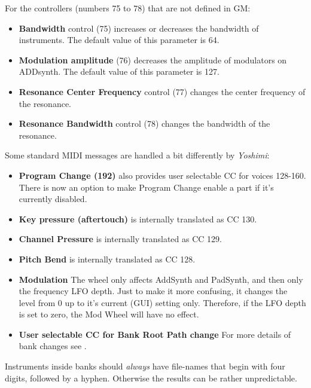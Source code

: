   For the controllers (numbers 75 to 78) that are not defined in GM:

   \begin{itemize}
      \item \textbf{Bandwidth} control (75) increases or decreases the bandwidth
      of instruments. The default value of this parameter is 64. 
      \item \textbf{Modulation amplitude} (76) decreases the amplitude of
      modulators on ADDsynth. The default value of this parameter is 127. 
      \item \textbf{Resonance Center Frequency} control (77) changes the center
      frequency of the resonance. 
      \item \textbf{Resonance Bandwidth} control (78) changes the bandwidth of the
      resonance. 
   \end{itemize}

   Some standard MIDI messages are handled a bit differently by
   \textsl{Yoshimi}:

   \begin{itemize}
      \item \textbf{Program Change (192)}
         also provides user selectable CC for
         voices 128-160.  There is now an option to make Program Change enable
         a part if it's currently disabled.
      \item \textbf{Key pressure (aftertouch)}
         is internally translated as CC 130.
      \item \textbf{Channel Pressure}
         is internally translated as CC 129.
      \item \textbf{Pitch Bend}
         is internally translated as CC 128.
      \item \textbf{Modulation}
         The wheel only affects AddSynth and PadSynth, and then only the
         frequency LFO depth. Just to make it more confusing, it changes the
         level from 0 up to it's current (GUI) setting only. Therefore, if the
         LFO depth is set to zero, the Mod Wheel will have no effect.
      \item \textbf{User selectable CC for Bank Root Path change}
         For more details of bank changes see
         .
   \end{itemize}

   Instruments inside banks should \textsl{always} have file-names that
   begin with four digits,  followed
   by a hyphen. Otherwise the results can be rather unpredictable.

